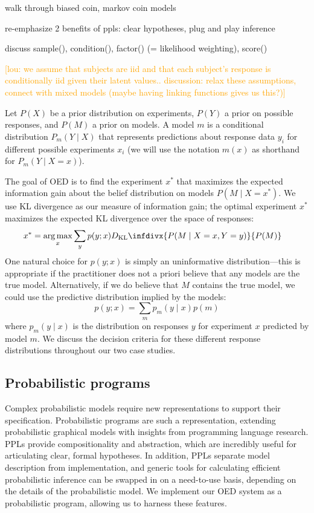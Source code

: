 \documentclass{article}
\newcommand{\dkl}{D_\mathrm{KL}\infdivx}
\newcommand{\lou}[1]{\textcolor{orange}{[lou: #1]}}
\newcommand{\cas}[1]{ \textsf{\color{darkgray} \scriptsize #1} }
\DeclareMathOperator*{\argmax}{arg\,max}
\begin{document}
\cas{walk through biased coin, markov coin models}

\cas{re-emphasize 2 benefits of ppls: clear hypotheses, plug and play inference}

\cas{discuss sample(), condition(), factor() (= likelihood weighting), score()}

\lou{we assume that subjects are iid and that each subject's response is conditionally iid given their latent values.. discussion: relax these assumptions, connect with mixed models (maybe having linking functions gives us this?)}

Let $P(X)$ be a prior distribution on experiments, $P(Y)$ a prior on possible responses, and $P(M)$ a prior on models.
A model $m$ is a conditional distribution $P_m(Y \mid X)$ that represents predictions about response data $y_i$ for different possible experiments $x_i$ (we will use the notation $m(x)$ as shorthand for $P_m(Y \mid X = x)$).

The goal of OED is to find the experiment $x^{*}$ that maximizes the expected information gain about the belief distribution on models $P(M \mid X = x^{*})$.
We use KL divergence as our measure of information gain; the optimal experiment $x^*$ maximizes the expected KL divergence over the space of responses:
\begin{align}
x^{*} &= \argmax_{x} \sum\limits_{y} p(y ; x) \dkl{ P(M \mid X = x, Y = y) }{ P(M) } \label{eq:oed}
\end{align}
One natural choice for $p(y ; x)$ is simply an uninformative distribution---this is appropriate if the practitioner does not a priori believe that any models are the true model.
Alternatively, if we do believe that $M$ contains the true model, we could use the predictive distribution implied by the models:
$$ p(y ; x) = \sum\limits_{m}p_m(y \mid x)p(m) $$
where $p_m(y \mid x)$ is the distribution on responses $y$ for experiment $x$ predicted by model $m$.
We discuss the decision criteria for these different response distributions throughout our two case studies.

\subsection{Probabilistic programs}

Complex probabilistic models require new representations to support their specification. Probabilistic programs are such a representation, extending probabilistic graphical models with insights from programming language research.
PPLs provide compositionality and abstraction, which are incredibly useful for articulating clear, formal hypotheses. In addition, PPLs separate model description from implementation, and generic tools for calculating efficient probabilistic inference can be swapped in on a need-to-use basis, depending on the details of the probabilistic model.
We implement our OED system as a probabilistic program, allowing us to harness these features.
\end{document}
